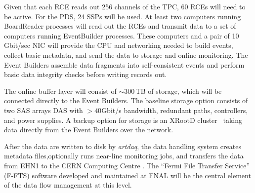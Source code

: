 
Given that each RCE reads out 256 channels of the TPC, 60 RCEs
will need to be active.  For the PDS, 24 SSPs will be used.  At least two computers 
running BoardReader processes will read out
the RCEs and transmit data to a set of computers running EventBuilder processes.
These computers and a
pair of 10\,Gbit/sec NIC will provide the CPU and networking needed to
build events, collect basic metadata, and send the data to storage and
online monitoring.  
The Event Builders assemble data fragments into self-consistent events and perform basic data integrity checks before writing records out.

The online buffer layer will consist of $\sim$300\,TB of storage,
which will be connected directly to the Event Builders.  The baseline
storage option consists of two SAS arrays DAS with $>40$Gbit/s bandwidth,
redundant paths, controllers, and power supplies.
A backup option for storage is an XRootD cluster~\cite{xrootd} taking
data directly from the Event Builders over the network.

After the data are written to disk by {\it artdaq}, the data handling
system creates metadata files,optionally  runs near-line monitoring jobs, and
transfers the data from EHN1 to the CERN Computing Centre \cite{docdb1212}.
The ``Fermi File Transfer Service'' (F-FTS) software 
developed and maintained at FNAL will be the central element
of the data flow management at this level.

